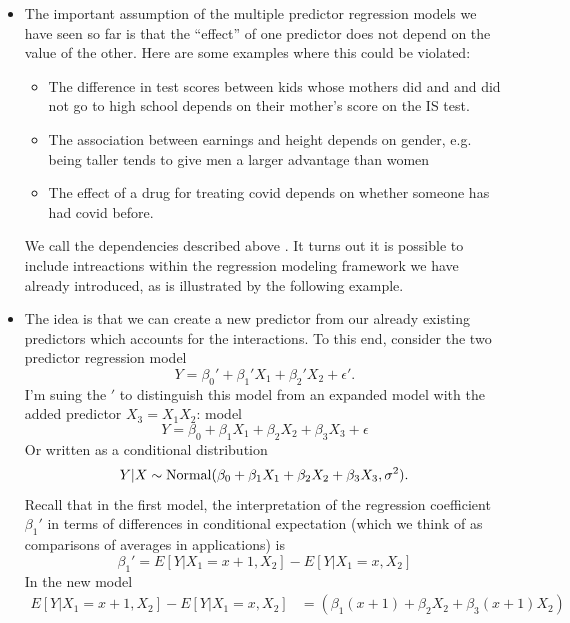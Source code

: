 \begin{itemize}
\item The important assumption of the multiple predictor regression models we have seen so far is that the ``effect'' of one predictor does not depend on the value of the other. Here are some examples where this could be violated:
\begin{itemize}
\item The difference in test scores between kids whose mothers did and and did not go to high school depends on their mother's score on the IS test.
\item  The association between earnings and height depends on gender, e.g. being taller tends to give men a larger advantage than women
\item The effect of a drug for treating covid depends on whether someone has had covid before. 
\end{itemize}
We call the dependencies described above . 
It turns out it is possible to include intreactions within the regression modeling framework we have already introduced, as is illustrated by the following example. 
\item The idea is that we can create a new predictor from our already existing predictors which accounts for the interactions. To this end, consider the two predictor regression model 
\begin{equation*}
Y = \beta_0' + \beta_1' X_1 + \beta_2' X_2 + \epsilon'.
\end{equation*} 
I'm suing the $'$ to distinguish this model from an expanded model with the added predictor $X_3 = X_1X_2$:
model 
\begin{equation*}
Y = \beta_0 + \beta_1 X_1 + \beta_2 X_2 + \beta_3 X_3 + \epsilon
\end{equation*} 
Or written as a conditional distribution 
\begin{equation*}
Y|X \sim {\rm Normal}( \beta_0 + \beta_1 X_1 + \beta_2 X_2 + \beta_3 X_3, \sigma^2). 
\end{equation*} 
Recall that in the first model, the interpretation of the regression coefficient $\beta_1'$ in terms of differences in conditional expectation (which we think of as comparisons of averages in applications) is 
\begin{equation*}
\beta_1' = E[Y|X_1 = x+1,X_2] - E[Y|X_1 = x,X_2] 
\end{equation*}
In the new model
\begin{align*}
 E[Y|X_1 = x+1,X_2] - E[Y|X_1 = x,X_2]  &=  \left(\beta_1 (x+1)+ \beta_2 X_2 + \beta_3 (x+1)X_2\right)\\

\end{align*}
\end{itemize}
